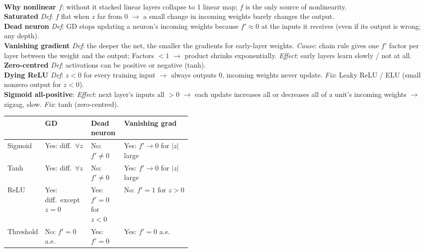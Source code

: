 \documentclass[10pt]{article}
\newcommand{\sub}[1]{\textit{#1}:}  %
\begin{document}
\begin{multicols*}{3}
\begin{minipage}{\linewidth}
\end{minipage}\\
\textbf{Why nonlinear $f$}: without it stacked linear layers collapse to 1 linear map; $f$ is the only source of nonlinearity.\\
\textbf{Saturated} \sub{Def} $f$ flat when $z$ far from 0 $\to$ a small change in incoming weights barely changes the output.\\
\textbf{Dead neuron} \sub{Def} GD stops updating a neuron's incoming weights because $f'\approx0$ at the inputs it receives (even if its output is wrong; any depth).\\
\textbf{Vanishing gradient} \sub{Def} the deeper the net, the smaller the gradients for early-layer weights. \sub{Cause} chain rule gives one $f'$ factor per layer between the weight and the output; Factors $<1$ $\to$ product shrinks exponentially. \sub{Effect} early layers learn slowly / not at all.\\
\textbf{Zero-centred} \sub{Def} activations can be positive or negative (tanh).\\
\textbf{Dying ReLU} \sub{Def} $z<0$ for every training input $\to$ always outputs 0, incoming weights never update. \sub{Fix} Leaky ReLU / ELU (small nonzero output for $z<0$).\\
\textbf{Sigmoid all-positive}: \sub{Effect} next layer's inputs all $>0$ $\to$ each update increases all or decreases all of a unit's incoming weights $\to$ zigzag, slow. \sub{Fix} tanh (zero-centred).\\
{\fontsize{4}{4.7}\selectfont\setlength{\tabcolsep}{2pt}\renewcommand{\arraystretch}{0.95}%
\begin{tabularx}{\linewidth}{@{}l>{\raggedright\arraybackslash}p{0.25\linewidth}>{\raggedright\arraybackslash}p{0.18\linewidth}>{\raggedright\arraybackslash}X@{}}
 & \textbf{GD} & \textbf{Dead neuron} & \textbf{Vanishing grad}\\\hline
Sigmoid & Yes: diff.\ $\forall z$ & No: $f'\ne0$ & Yes: $f'\to0$ for $|z|$ large\\
Tanh & Yes: diff.\ $\forall z$ & No: $f'\ne0$ & Yes: $f'\to0$ for $|z|$ large\\
ReLU & Yes: diff.\ except $z=0$ & Yes: $f'=0$ for $z<0$ & No: $f'=1$ for $z>0$\\
Threshold & No: $f'=0$ a.e. & Yes: $f'=0$ & Yes: $f'=0$ a.e.
\end{tabularx}}\\

\end{multicols*}
\end{document}
